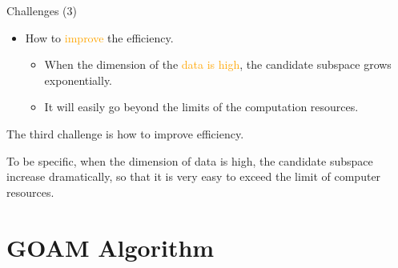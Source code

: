 \documentclass[
size=14pt,
paper=smartboard,  %
mode=present, 		%
display=slides, 	%
style=tuliplab,  	%
pauseslide,
fleqn,leqno]{powerdot}
\begin{document}
	
	\begin{slide}[toc=,bm=]{Challenges (3)}
		
		\begin{itemize}
			\item
			How to \textcolor{orange}{improve} the efficiency.
			
			\begin{itemize}
				
				\item
				When the dimension of the \textcolor{orange}{data is high},
				the candidate subspace grows exponentially.
				
				\item
				It will easily go beyond the limits of the computation resources.
				
			\end{itemize}
		\end{itemize}
		
		\begin{note}
			The third challenge is how to improve efficiency.
			
			To be specific,
			when the dimension of data is high,
			the candidate subspace increase dramatically,
			so that it is very easy to exceed the limit of computer resources.
		\end{note}
		
	\end{slide}
	
	
	\section{GOAM Algorithm}
	
\end{document}
